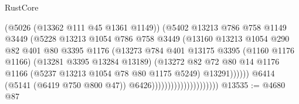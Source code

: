 \begin{lexlean}{RustCore}
\begin{coremodule}
                                                (@5026 (@13362 @111 @45 @1361 @1149))
                                                (@5402
                                                  @13213
                                                  @786
                                                  @758
                                                  @1149
                                                  @3449
                                                  (@5228
                                                    @13213
                                                    @1054
                                                    @786
                                                    @758
                                                    @3449
                                                    (@13160
                                                      @13213
                                                      @1054
                                                      @290
                                                      @82
                                                      @401
                                                      @80
                                                      @3395
                                                      @1176
                                                      (@13273
                                                        @784
                                                        @401
                                                        @13175
                                                        @3395
                                                        (@1160 @1176 @1166)
                                                        (@13281 @3395 @13284 @13189)
                                                        (@13272
                                                          @82
                                                          @72
                                                          @80
                                                          @14
                                                          @1176
                                                          @1166
                                                          (@5237 @13213 @1054 @78 @80 @1175 @5249)
                                                          @13291))))))
                                              @6414
                                              (@5141 (@6419 @750 @800 @47))
                                              @6426)))))))))))))))))))))
@13535 := @4680 @87

\end{coremodule}
\end{lexlean}
